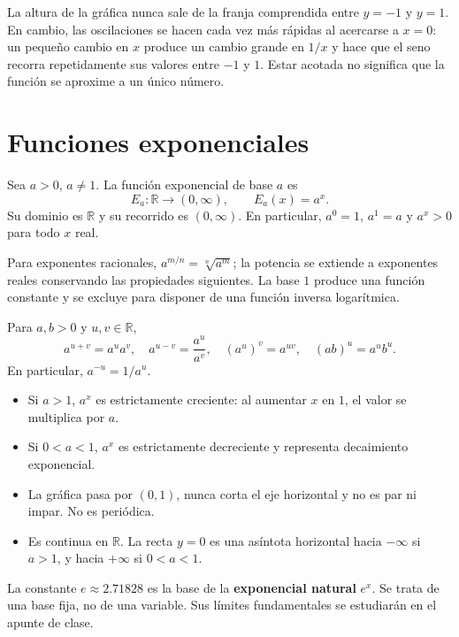 \documentclass[10pt,a5paper]{article}
\begin{document}
La altura de la gráfica nunca sale de la franja comprendida entre $y=-1$ y $y=1$. En cambio, las oscilaciones se hacen cada vez más rápidas al acercarse a $x=0$: un pequeño cambio en $x$ produce un cambio grande en $1/x$ y hace que el seno recorra repetidamente sus valores entre $-1$ y $1$. Estar acotada no significa que la función se aproxime a un único número.

\section*{Funciones exponenciales}

\begin{definicion}
Sea $a>0$, $a\neq1$. La función exponencial de base $a$ es
\[
  E_a\colon\mathbb{R}\to(0,\infty),\qquad E_a(x)=a^x.
\]
Su dominio es $\mathbb{R}$ y su recorrido es $(0,\infty)$. En particular, $a^0=1$, $a^1=a$ y $a^x>0$ para todo $x$ real.
\end{definicion}

Para exponentes racionales, $a^{m/n}=\sqrt[n]{a^m}$; la potencia se extiende a exponentes reales conservando las propiedades siguientes. La base $1$ produce una función constante y se excluye para disponer de una función inversa logarítmica.

\begin{proposicion}
Para $a,b>0$ y $u,v\in\mathbb{R}$,
\[
  a^{u+v}=a^ua^v,\quad a^{u-v}=\frac{a^u}{a^v},\quad
  (a^u)^v=a^{uv},\quad (ab)^u=a^ub^u.
\]
En particular, $a^{-u}=1/a^u$.
\end{proposicion}

\begin{itemize}
  \item Si $a>1$, $a^x$ es estrictamente creciente: al aumentar $x$ en $1$, el valor se multiplica por $a$.
  \item Si $0<a<1$, $a^x$ es estrictamente decreciente y representa decaimiento exponencial.
  \item La gráfica pasa por $(0,1)$, nunca corta el eje horizontal y no es par ni impar. No es periódica.
  \item Es continua en $\mathbb{R}$. La recta $y=0$ es una asíntota horizontal hacia $-\infty$ si $a>1$, y hacia $+\infty$ si $0<a<1$.
\end{itemize}

La constante $e\approx2.71828$ es la base de la \textbf{exponencial natural} $e^x$. Se trata de una base fija, no de una variable. Sus límites fundamentales se estudiarán en el apunte de clase.
\end{document}
